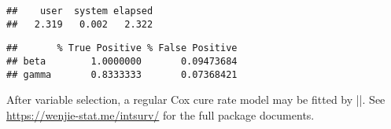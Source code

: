 \begin{verbatim}
##    user  system elapsed 
##   2.319   0.002   2.322
\end{verbatim}

\begin{Shaded}
\begin{Highlighting}[]
\end{Highlighting}
\end{Shaded}

\begin{verbatim}
##       % True Positive % False Positive
## beta        1.0000000       0.09473684
## gamma       0.8333333       0.07368421
\end{verbatim}

After variable selection, a regular Cox cure rate model may be fitted by
\VERB|\OperatorTok{::}\NormalTok{()}|.
See \url{https://wenjie-stat.me/intsurv/} for the full package
documents.
